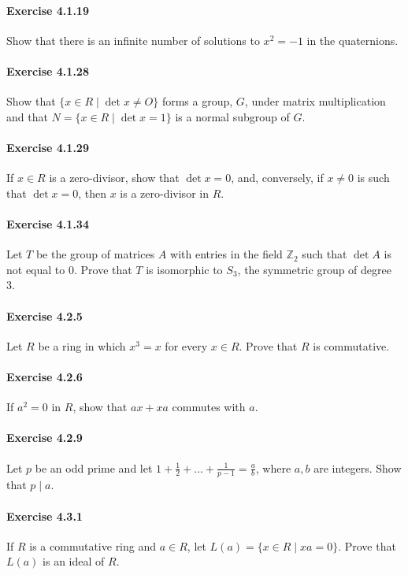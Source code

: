 \documentclass{article}
\begin{document}
\paragraph{Exercise 4.1.19} Show that there is an infinite number of solutions to $x^2 = -1$ in the quaternions.

\paragraph{Exercise 4.1.28} Show that $\{x \in R \mid \det x \neq O\}$ forms a group, $G$, under matrix multiplication and that $N = \{x \in R \mid \det x = 1\}$ is a normal subgroup of $G$.

\paragraph{Exercise 4.1.29} If $x \in R$ is a zero-divisor, show that $\det x = 0$, and, conversely, if $x \neq 0$ is such that $\det x = 0$, then $x$ is a zero-divisor in $R$.

\paragraph{Exercise 4.1.34} Let $T$ be the group of matrices $A$ with entries in the field $\mathbb{Z}_2$ such that $\det A$ is not equal to 0. Prove that $T$ is isomorphic to $S_3$, the symmetric group of degree 3.

\paragraph{Exercise 4.2.5} Let $R$ be a ring in which $x^3 = x$ for every $x \in R$. Prove that $R$ is commutative.

\paragraph{Exercise 4.2.6} If $a^2 = 0$ in $R$, show that $ax + xa$ commutes with $a$.

\paragraph{Exercise 4.2.9} Let $p$ be an odd prime and let $1 + \frac{1}{2} + ... + \frac{1}{p - 1} = \frac{a}{b}$, where $a, b$ are integers. Show that $p \mid a$.

\paragraph{Exercise 4.3.1} If $R$ is a commutative ring and $a \in R$, let $L(a) = \{x \in R \mid xa = 0\}$. Prove that $L(a)$ is an ideal of $R$.
\end{document}
